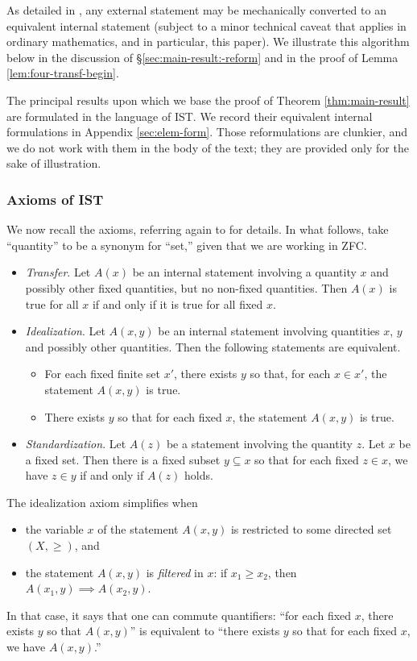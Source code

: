 \documentclass[reqno]{amsart}
\theoremstyle{plain} \newtheorem{theorem} {Theorem}
\theoremstyle{definition} \newtheorem{definition} [theorem] {Definition}
\theoremstyle{itplain} %
\numberwithin{equation}{section}
\numberwithin{theorem}{section}
\renewcommand{\geq}{\geqslant}
\begin{document}
As detailed in \cite[\S2]{MR469763}, any external statement may be mechanically converted to an equivalent internal statement (subject to a minor technical caveat that applies in ordinary mathematics, and in particular, this paper).  We illustrate this algorithm below in the discussion of \S\ref{sec:main-result:-reform} and in the proof of Lemma \ref{lem:four-transf-begin}.

The principal results upon which we base the proof of Theorem \ref{thm:main-result}  are formulated in the language of IST.  We record their equivalent internal formulations in Appendix \ref{sec:elem-form}.  Those reformulations are clunkier, and we do not work with them in the body of the text; they are provided only for the sake of illustration.



\subsubsection{Axioms of IST}\label{sec:axioms-ist}
We now recall the axioms, referring again to \cite{MR469763} for details.  In what follows, take ``quantity'' to be a synonym for ``set,'' given that we are working in ZFC.
\begin{itemize}
\item \emph{Transfer}.  Let $A(x)$ be an internal statement involving a quantity $x$ and possibly other fixed quantities, but no non-fixed quantities.  Then $A(x)$ is true for all $x$ if and only if it is true for all fixed $x$.
\item \emph{Idealization}.  Let $A(x,y)$ be an internal statement involving quantities $x$, $y$ and possibly other quantities.  Then the following statements are equivalent.
  \begin{itemize}
  \item For each fixed finite set $x'$, there exists $y$ so that, for each $x \in x'$, the statement $A(x,y)$ is true.
  \item There exists $y$ so that for each fixed $x$, the statement $A(x,y)$ is true.
  \end{itemize}
\item \emph{Standardization}.  Let $A(z)$ be a statement involving the quantity $z$.  Let $x$ be a fixed set.  Then there is a fixed subset $y \subseteq x$ so that for each fixed $z \in x$, we have $z \in y$ if and only if $A(z)$ holds.
\end{itemize}

The idealization axiom simplifies when
\begin{itemize}
\item the variable $x$ of the statement $A(x,y)$ is restricted to some directed set $(X, \geq)$, and
\item the statement $A(x,y)$ is \emph{filtered} in $x$: if $x_1 \geq x_2$, then $A(x_1,y) \implies A(x_2,y)$.
\end{itemize}
In that case, it says that one can commute quantifiers: ``for each fixed $x$, there exists $y$ so that $A(x,y)$'' is equivalent to ``there exists $y$ so that for each fixed $x$, we have $A(x,y)$.''
\end{document}

